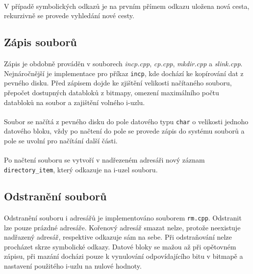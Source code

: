 \documentclass[12pt]{scrartcl}
\begin{document}
\paragraph{}
V případě symbolických odkazů je na prvním přímem odkazu uložena nová cesta, rekurzivně se provede vyhledání nové cesty.

\subsection{Zápis souborů}
\paragraph{}
Zápis je obdobně prováděn v souborech \textit{{incp.cpp}}, \textit{{cp.cpp}}, \textit{{mkdir.cpp}} a \textit{{slink.cpp}}. Nejnáročnější je implementace pro příkaz \texttt{{incp}}, kde dochází ke kopírování dat z pevného disku. Před zápisem dojde ke zjištění velikosti načítaného souboru, přepočet dostupných databloků z bitmapy, omezení maximálního počtu databloků na soubor a zajištění volného i-uzlu.
\paragraph{}
Soubor se načítá z pevného disku do pole datového typu \texttt{{char}} o velikosti jednoho datového bloku, vždy po načtení do pole se provede zápis do systému souborů a pole se uvolní pro načítání další části.
\paragraph{}
Po načtení souboru se vytvoří v nadřezeném adresáři nový záznam \texttt{{directory\_item}}, který odkazuje na i-uzel souboru.

\subsection{Odstranění souborů}
\paragraph{}
Odstranění souboru i adresářů je implementováno souborem \texttt{rm.cpp}. Odstranit lze pouze prázdné adresáře. Kořenový adresář smazat nelze, protože neexistuje nadřazený adresář, respektive odkazuje sám na sebe. Při odstraňování nelze procházet skrze symbolické odkazy. Datové bloky se mažou až při opětovném zápisu, při mazání docházi pouze k vynulování odpovídajícího bitu v bitmapě a nastavení použitého i-uzlu na nulové hodnoty.
\end{document}
